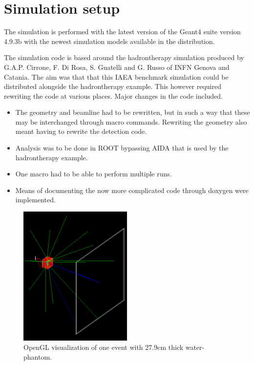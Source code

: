 \section{Simulation setup} %
The simulation is performed with the latest version of the Geant4 suite version 4.9.3b with the newest simulation models available in the distribution.

The simulation code is based around the hadrontherapy simulation produced by G.A.P. Cirrone, F. Di Rosa, S. Guatelli and  G. Russo of INFN Genova and Catania. The aim was that that this IAEA benchmark simulation could be distributed alongside the hadrontherapy example. This however required rewriting the code at various places. Major changes in the code included.
\begin{itemize}
\item The geometry and beamline had to be rewritten, but in such a way that these may be interchanged through macro commands. Rewriting the geometry also meant having to rewrite the detection code.
\item Analysis was to be done in ROOT bypassing AIDA that is used by the hadrontherapy example.
\item One macro had to be able to perform multiple runs.
\item Means of documenting the now more complicated code through doxygen were implemented.
\end{itemize}


\begin{figure}[h] 
\begin{center}
\includegraphics[width=0.5\textwidth]{images/oneEvent.png}  
\caption{\label{fig:oneEvent} OpenGL visualization of one event with 27.9cm thick water-phantom.}
\end{center}
\end{figure}

